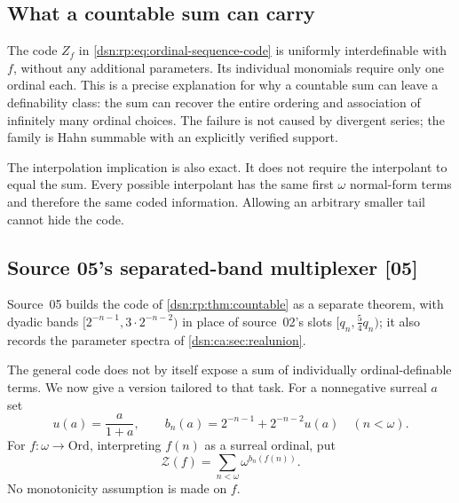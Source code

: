 \documentclass[11pt,a4paper]{article}
\numberwithin{equation}{section}
\theoremstyle{definition}
\theoremstyle{remark}
\newcommand{\Ord}{\mathrm{Ord}}
\newcommand{\src}[1]{\textup{\textsf{\small[#1]}}}
\newcommand{\Zc}{\mathcal Z}
\begin{document}
\subsection{What a countable sum can carry}
The code $Z_f$ in \eqref{dsn:rp:eq:ordinal-sequence-code} is uniformly
interdefinable with $f$, without any additional parameters. Its
individual monomials require only one ordinal each. This is a precise
explanation for why a countable sum can leave a definability class:
the sum can recover the entire ordering and association of infinitely
many ordinal choices. The failure is not caused by divergent series;
the family is Hahn summable with an explicitly verified support.

The interpolation implication is also exact. It does not require the
interpolant to equal the sum. Every possible interpolant has the same
first $\omega$ normal-form terms and therefore the same coded
information. Allowing an arbitrary smaller tail cannot hide the code.




\subsection{Source 05's separated-band multiplexer \src{05}}
\label{dsn:ca:sec:codes}

Source~05 builds the code of \cref{dsn:rp:thm:countable} as a separate
theorem, with dyadic bands $[2^{-n-1},3\cdot2^{-n-2})$ in place of source~02's
slots $[q_n,\tfrac54q_n)$; it also records the parameter spectra of
\cref{dsn:ca:sec:realunion}.

The general code does not by itself expose a sum of individually
ordinal-definable terms. We now give a version tailored to that task.
For a nonnegative surreal $a$ set
\begin{equation}\label{dsn:ca:eq:band}
 u(a)=\frac{a}{1+a},\qquad
 b_n(a)=2^{-n-1}+2^{-n-2}u(a)\quad(n<\omega).
\end{equation}
For $f:\omega\to\Ord$, interpreting $f(n)$ as a surreal ordinal, put
\begin{equation}\label{dsn:ca:eq:code}
 \boxed{\displaystyle
 \Zc(f)=\sum_{n<\omega}\omega^{b_n(f(n))}.}
\end{equation}
No monotonicity assumption is made on $f$.
\end{document}
